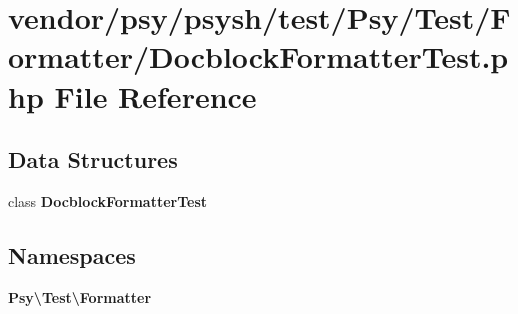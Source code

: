 \section{vendor/psy/psysh/test/\+Psy/\+Test/\+Formatter/\+Docblock\+Formatter\+Test.php File Reference}
\label{_docblock_formatter_test_8php}
\subsection*{Data Structures}
\begin{DoxyCompactItemize}
\item 
class {\bf Docblock\+Formatter\+Test}
\end{DoxyCompactItemize}
\subsection*{Namespaces}
\begin{DoxyCompactItemize}
\item 
 {\bf Psy\textbackslash{}\+Test\textbackslash{}\+Formatter}
\end{DoxyCompactItemize}
